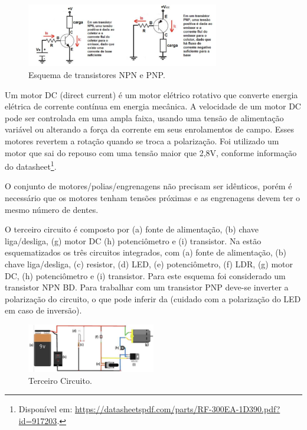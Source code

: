 \documentclass{textolivre-html}
\begin{document}
\begin{figure}[h!]
\centering
\includegraphics[width=0.75\textwidth]{figure-18.pdf}
\caption{Esquema de transistores NPN e PNP.}
\label{fig12}
\end{figure}
 
Um motor DC (direct current) é um motor elétrico rotativo que converte energia
elétrica de corrente contínua em energia mecânica. A velocidade de um motor DC
pode ser controlada em uma ampla faixa, usando uma tensão de alimentação
variável ou alterando a força da corrente em seus enrolamentos de campo. Esses
motores revertem a rotação quando se troca a polarização. Foi utilizado um
motor que sai do repouso com uma tensão maior que 2,8V, conforme informação do
datasheet\footnote{Disponível em:
\url{https://datasheetspdf.com/parts/RF-300EA-1D390.pdf?id=917203}.}.

O conjunto de motores/polias/engrenagens não precisam ser idênticos, porém é
necessário que os motores tenham tensões próximas e as engrenagens devem ter o
mesmo número de dentes.

O terceiro circuito é composto por (a) fonte de alimentação, (b) chave
liga/desliga, (g) motor DC (h) potenciômetro e (i) transistor. Na 
estão esquematizados os três circuitos integrados, com (a) fonte de
alimentação, (b) chave liga/desliga, (c) resistor, (d) LED, (e) potenciômetro,
(f) LDR, (g) motor DC, (h) potenciômetro e (i) transistor. Para este esquema
foi considerado um transistor NPN BD. Para trabalhar com um transistor PNP
deve-se inverter a polarização do circuito, o que pode inferir da 
(cuidado com a polarização do LED em caso de inversão).

\begin{figure}[h!]
\centering
\includegraphics[width=0.5\textwidth]{figure-19.pdf}
\caption{Terceiro Circuito.}
\label{fig13}
\end{figure}
\end{document}
